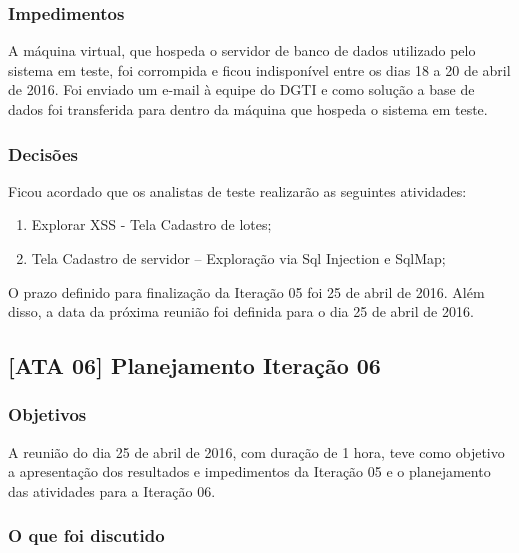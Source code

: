 \documentclass[
    12pt,               %
    openright,          %
    oneside,            %
    a4paper,            %
    section=TITLE,     %
    english,            %
    french,             %
    spanish,            %
    brazil              %
    ]{abntex2}
\begin{document}
\subsubsection*{Impedimentos}

A máquina virtual, que hospeda o servidor de banco de dados utilizado pelo sistema em teste, foi corrompida e ficou indisponível entre os dias 18 a 20 de abril de 2016. Foi enviado um e-mail à equipe do DGTI e como solução a base de dados foi transferida para dentro da máquina que hospeda o sistema em teste.



\subsubsection*{Decisões}

Ficou acordado que os analistas de teste realizarão as seguintes atividades:



\begin{enumerate}[start=1]
	
\item Explorar XSS - Tela Cadastro de lotes;
	
\item Tela Cadastro de servidor -- Exploração via Sql Injection e SqlMap;

\end{enumerate}

O prazo definido para finalização da Iteração 05 foi 25 de abril de 2016. Além disso, a data da próxima reunião foi definida para o dia 25 de abril de 2016.



\subsection*{{[}ATA 06{]} Planejamento Iteração 06}


\subsubsection*{Objetivos}

A reunião do dia 25 de abril de 2016, com duração de 1 hora, teve como objetivo a apresentação dos resultados e impedimentos da Iteração 05 e o planejamento das atividades para a Iteração 06.



\subsubsection*{O que foi discutido}
\end{document}
